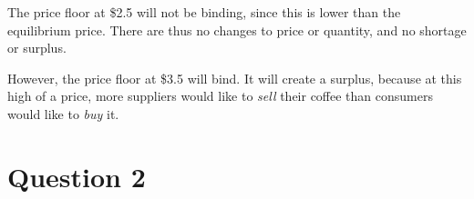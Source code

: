 \documentclass[12pt]{article}
\begin{document}
\begin{enumerate}
\vspace{2mm}

The price floor at \$2.5 will not be binding, since this is lower than the equilibrium price. There are thus no changes to price or quantity, and no shortage or surplus.

\vspace{2mm}

However, the price floor at \$3.5 will bind. It will create a surplus, because at this high of a price, more suppliers would like to \textit{sell} their coffee than consumers would like to \textit{buy} it.

\end{enumerate}

\section*{Question 2}
\end{document}
